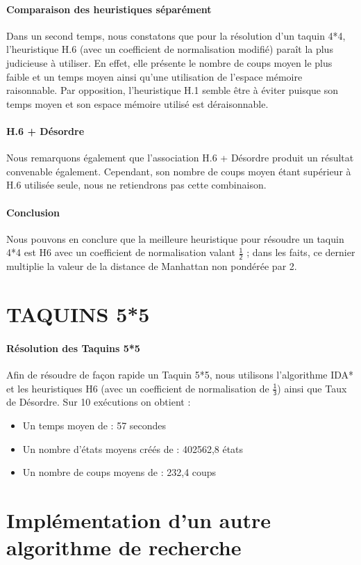 \documentclass[10pt,a4paper]{report}
\begin{document}
\paragraph{Comparaison des heuristiques séparément}{Dans un second temps, nous constatons que pour la résolution d'un taquin 4*4, l'heuristique H.6 (avec un coefficient de normalisation modifié) paraît la plus judicieuse à utiliser. En effet, elle présente le nombre de coups moyen le plus faible et un temps moyen ainsi qu'une utilisation de l'espace mémoire raisonnable. Par opposition, l'heuristique H.1 semble être à éviter puisque son temps moyen et son espace mémoire utilisé est déraisonnable.}
\paragraph{H.6 + Désordre}{Nous remarquons également que l'association H.6 + Désordre produit un résultat convenable également. Cependant, son nombre de coups moyen étant supérieur à H.6 utilisée seule, nous ne retiendrons pas cette combinaison.}
\paragraph{Conclusion}{Nous pouvons en conclure que la meilleure heuristique pour résoudre un taquin 4*4 est H6 avec un coefficient de normalisation valant $\mathsf{\tfrac{1}{2}}$ ; dans les faits, ce dernier multiplie la valeur de la distance de Manhattan non pondérée par 2.}
\section{TAQUINS 5*5}
\paragraph{Résolution des Taquins 5*5}{Afin de résoudre de façon rapide un Taquin 5*5, nous utilisons l'algorithme IDA* et les heuristiques H6 (avec un coefficient de normalisation de $\mathsf{\tfrac{1}{3}}$) ainsi que Taux de Désordre. Sur 10 exécutions on obtient : }
\begin{itemize}
\item Un temps moyen de : 57 secondes
\item Un nombre d'états moyens créés de : 402562,8 états
\item Un nombre de coups moyens de : 232,4 coups
\end{itemize}
\section{Implémentation d'un autre algorithme de recherche}
\end{document}
